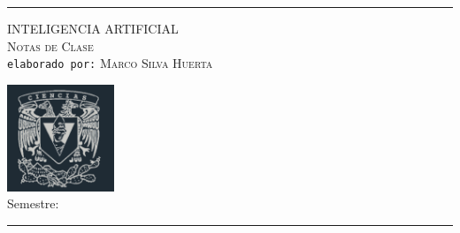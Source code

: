 \begin{center}
        \rule[1.5ex]{1\linewidth}{0.5mm} 
\end{center}

\begin{minipage}{12cm}
    {\Large\textsc{INTELIGENCIA ARTIFICIAL}} \\

    {\large\textsc{Notas de Clase}}\\            
    
    \texttt{elaborado por:} {\large \textsc{Marco Silva Huerta}}\\ 
        
\end{minipage}
\begin{minipage}{4.1cm}
    \includegraphics[height=3.2cm]{assets/imagenes/cienciasBLRY.png}\\    
    Semestre: \semestre
\end{minipage}

\begin{center}
    \rule[1.5ex]{1\linewidth}{0.5mm} 
\end{center}
